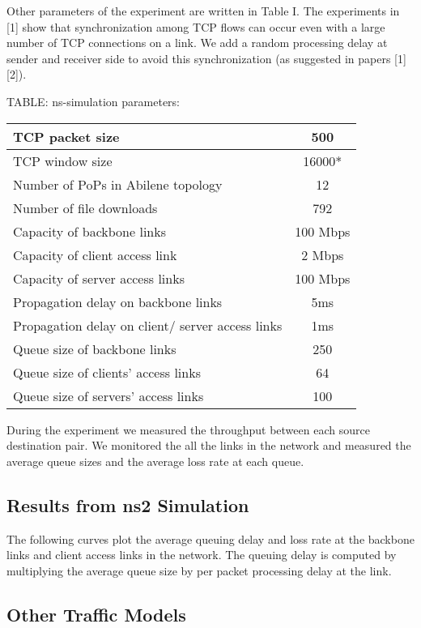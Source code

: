 Other parameters of the experiment are written in Table I. The experiments in [1] show that synchronization among TCP flows can occur even with a large number of TCP connections on a link. We add a random processing delay at sender and receiver side to avoid this synchronization (as suggested in papers [1] [2]).

TABLE: ns-simulation parameters:
\begin{center}
  \begin{tabular}{| l | c | }
    \hline
TCP packet size & 500\\ \hline
TCP window size & 16000*\\ \hline
Number of PoPs in Abilene topology & 12\\ \hline
Number of  file downloads & 792\\ \hline
Capacity of backbone links & 100 Mbps\\ \hline
Capacity of client access link & 2 Mbps\\ \hline
Capacity of server access links & 100 Mbps\\ \hline
Propagation delay on backbone links & 5ms\\ \hline
Propagation delay on client/ server access links & 1ms\\ \hline
Queue size of backbone links & 250\\ \hline
Queue size of clients' access links & 64\\ \hline
Queue size of servers' access links & 100\\ \hline
    \hline
  \end{tabular}
\end{center}

During the experiment we measured the throughput between each source destination pair. We monitored the all the links in the network and measured the average queue sizes and the average loss rate at each queue. 

\subsection{Results from ns2 Simulation}

The following curves plot the average queuing delay and loss rate at the backbone links and client access links in the network. The queuing delay is computed by multiplying the average queue size by per packet processing delay at the link.

\subsection{Other Traffic Models}

